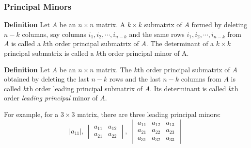 \documentclass[9pt,aspectratio=169]{beamer}
\begin{document}
\begin{frame}
	\frametitle{Principal Minors}
    \begin{block}{\bfseries Definition}
        Let $A$ be an $n\times n$ matrix. A $k\times k$ submatrix of $A$
        formed by deleting $n-k$ columns, say columns $i_1,i_2,\cdots,
        i_{n-k}$ and the same rows $i_1,i_2,\cdots, i_{n-k}$ from $A$ is
        called a $k$th order principal submatrix of $A$. The determinant of
        a $k\times k$ principal submatrix is called a $k$th order principal
        minor of A.
    \end{block}
    \begin{block}{\bfseries Definition}
        Let $A$ be an $n\times n$ matrix. The $k$th order principal submatrix
        of $A$ obtained by deleting the last $n-k$ rows and the last $n-k$
        columns from $A$ is called $k$th order leading principal submatrix of
        $A$. Its determinant is called $k$th order \emph{leading principal}
        minor of $A$.
    \end{block}
    For example, for a $3\times 3$ matrix, there are three leading principal
    minors:
    \begin{equation*}
        |a_{11}|,\,
        \begin{vmatrix}
            a_{11} & a_{12} \\
            a_{21} & a_{22}
        \end{vmatrix},\,
        \begin{vmatrix}
            a_{11} & a_{12} & a_{13} \\
            a_{21} & a_{22} & a_{23} \\
            a_{31} & a_{32} & a_{33}
		\end{vmatrix}
    \end{equation*}
\end{frame}
\end{document}
